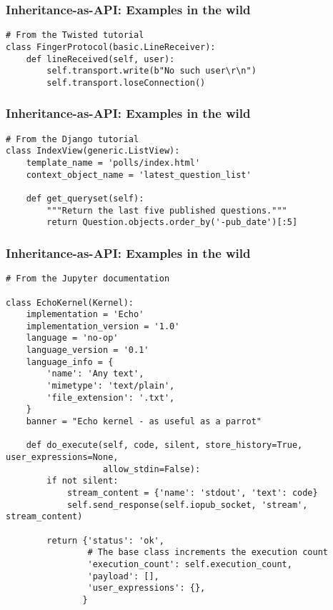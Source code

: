 \begin{frame}[fragile]
\frametitle{Inheritance-as-API: Examples in the wild}

\begin{lstlisting}
# From the Twisted tutorial
class FingerProtocol(basic.LineReceiver):
    def lineReceived(self, user):
        self.transport.write(b"No such user\r\n")
        self.transport.loseConnection()
\end{lstlisting}

\end{frame}

\begin{frame}[fragile]
\frametitle{Inheritance-as-API: Examples in the wild}

\begin{lstlisting}
# From the Django tutorial
class IndexView(generic.ListView):
    template_name = 'polls/index.html'
    context_object_name = 'latest_question_list'

    def get_queryset(self):
        """Return the last five published questions."""
        return Question.objects.order_by('-pub_date')[:5]
\end{lstlisting}

\end{frame}

\begin{frame}[fragile]
\frametitle{Inheritance-as-API: Examples in the wild}

\begin{lstlisting}
# From the Jupyter documentation

class EchoKernel(Kernel):
    implementation = 'Echo'
    implementation_version = '1.0'
    language = 'no-op'
    language_version = '0.1'
    language_info = {
        'name': 'Any text',
        'mimetype': 'text/plain',
        'file_extension': '.txt',
    }
    banner = "Echo kernel - as useful as a parrot"

    def do_execute(self, code, silent, store_history=True, user_expressions=None,
                   allow_stdin=False):
        if not silent:
            stream_content = {'name': 'stdout', 'text': code}
            self.send_response(self.iopub_socket, 'stream', stream_content)

        return {'status': 'ok',
                # The base class increments the execution count
                'execution_count': self.execution_count,
                'payload': [],
                'user_expressions': {},
               }
\end{lstlisting}

\end{frame}

